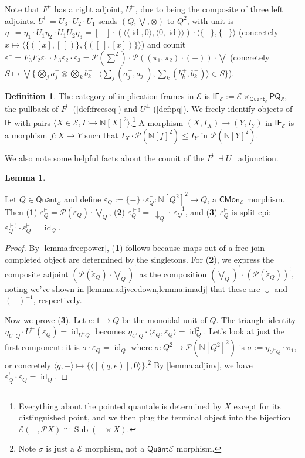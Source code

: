 \documentclass{article}
\makeatletter
\newcommand{\allproofs}{} %
\newif\ifproofsinappendix
\newcommand{\lemmawithproof}[3]{%
  \begin{lemma}\label{#1}
    #2  
    \ifproofsinappendix \hyperref[xxx#1]{(Proof)} \fi
  \end{lemma}
    \ifproofsinappendix
  \g@addto@macro\allproofs{%
    \par\medskip
    \noindent
    \subsection*{\cref{#1}}\par
    #2\par
    \begin{proof}\label{xxx#1}
      #3
    \end{proof}%
  }
      \else

    \begin{proof}
      #3
    \end{proof}
    \fi 
}
\theoremstyle{definition}
\newtheorem{definition}{Definition}[section]
\newtheorem{lemma}{Lemma}[section]
\newcommand{\N}{\mathbb{N}}
\newcommand{\cE}{\mathcal{E}}
\newcommand{\cP}{\mathcal{P}}
\newcommand{\cat}[1]{\mathsf{#1}}
\newcommand{\id}{\operatorname{id}}
\newcommand{\Sub}{\operatorname{Sub}}
\makeatother
\begin{document}
\noindent Note that $F^\vdash$ has a right adjoint, $U^\vdash$, due to being the composite of three left adjoints. $U^\vdash=U_3\cdot U_2\cdot U_1$ sends $(Q,\bigvee,\otimes)$ to $Q^2$, with unit is $\eta^\vdash = \eta_1\cdot U_1\eta_2\cdot U_1U_2\eta_3=[-]\cdot(\langle \langle \id, 0\rangle,\langle 0,\id\rangle\rangle)\cdot \langle \{-\},\{-\}\rangle$ (concretely $x\mapsto \langle\{([x],[\ ])\},\{([\ ],[x])\} \rangle$) and counit $\varepsilon^\vdash=F_3F_2\varepsilon_1\cdot F_3\varepsilon_2\cdot\varepsilon_3= \cP(\sum^2) \cdot\cP((\pi_1,\pi_2)\cdot (+)) \cdot \bigvee $ (concretely  $S\mapsto\bigvee\big\{\textstyle\bigotimes_j a^+_j\otimes\bigotimes_k b^-_k \ \big|\
\langle\sum_j(a^+_j,a^-_j),\sum_k(b^+_k,b^-_k)\rangle\in S\big\}$).


\begin{definition}
   The category of implication frames in $\cE$ is $\cat{IF}_\cE := \cE \times_{\cat{Quant}_\cE} \cat{PQ}_\cE$, the pullback of $F^\vdash$ (\cref{def:freeseq}) and $U^\bot$ (\cref{def:pq}). 
   We freely identify objects of $\cat{IF}$ with pairs $\langle X \in \cE, I\rightarrowtail \N[X]^2\rangle$.\footnote{
    Everything about the pointed quantale is determined by $X$ except for its distinguished point, and we then plug the terminal object into the bijection $\cE(-,\cP X)\cong \Sub(-\times X)$.} 
    A morphism $(X,I_X)\to (Y,I_Y)$ in $\cat{IF_\cE}$ is a morphism $f\colon X\to Y$ such that $I_X\cdot \cP(\N[f]^2) \leq I_Y$ in $\cP(\N[Y]^2)$.
\end{definition}

We also note some helpful facts about the counit of the $F^\vdash\dashv U^\vdash$ adjunction.


\lemmawithproof{lemma:epsilonfacts}{
Let $Q\in\cat{Quant}_\cE$ and define $\dot\varepsilon_Q:=\{-\}\cdot\varepsilon^\vdash_Q
\colon\N[Q^2]^2\to Q$, a $\cat{CMon}_\cE$ morphism. 
Then 
({\bf 1}) $\varepsilon^\vdash_Q=\cP(\dot\varepsilon_Q)\cdot\bigvee_Q$, 
({\bf 2}) $\varepsilon^{\vdash!}_Q=\ \downarrow_Q\cdot\ \dot\varepsilon_Q^{-1}$, and 
({\bf 3}) $\varepsilon^\vdash_Q$ is split epi:
    $\varepsilon^{\vdash!}_Q\cdot\varepsilon^\vdash_Q=\id_Q$.
}{
By \cref{lemma:freepower}, ({\bf 1}) follows because maps out of a free-join completed object are determined by the singletons. 
For ({\bf 2}), we express the composite adjoint $(\cP(\dot\varepsilon_Q)\cdot\bigvee_Q)^!$ as the composition $(\bigvee_Q)^! \cdot (\cP(\dot\varepsilon_Q))^!$, noting we've shown in \cref{lemma:adjveedown,lemma:imadj} that these are $\downarrow$ and $(-)^{-1}$, respectively.

Now we prove ({\bf 3}). Let $e\colon 1\to Q$ be the monoidal unit of $Q$. 
The triangle identity $\eta_{U^\vdash Q}\cdot U^\vdash(\varepsilon_Q) = \id_{U^\vdash Q}$ becomes $\eta_{U^\vdash Q}\cdot \langle \varepsilon_Q,\varepsilon_Q\rangle = \id_{Q}^2$. 
Let's look at just the first component: 
it is $\sigma\cdot \varepsilon_Q = \id_Q$ where $\sigma\colon Q^2\to \cP(\N[Q^2]^2)$ is $\sigma := \eta_{U^\vdash Q}\cdot \pi_1$, or concretely $\langle q, -\rangle \mapsto \{\langle [(q,e)],0\rangle\}$.\footnote{
Note $\sigma$ is just a $\cE$ morphism, not a $\cat{ Quant} \cE$ morphism.} By \cref{lemma:adjinv}, we have $\varepsilon^!_Q\cdot \varepsilon_Q = \id_Q$. 
}
\end{document}
